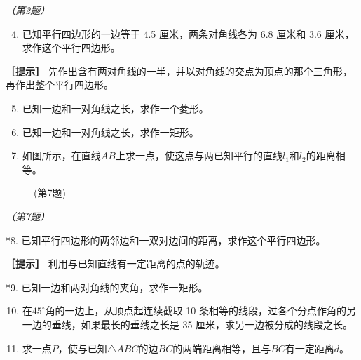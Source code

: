 \emph{（第2题）}

\begin{enumerate}
\setcounter{enumi}{3}
\item
  已知平行四边形的一边等于 4.5 厘米，两条对角线各为 6.8 厘米和 3.6
  厘米，求作这个平行四边形。
\end{enumerate}

\textbf{［提示］}
先作出含有两对角线的一半，并以对角线的交点为顶点的那个三角形，再作出整个平行四边形。

\begin{enumerate}
\setcounter{enumi}{4}
\item
  已知一边和一对角线之长，求作一个菱形。
\item
  已知一边和一对角线之长，求作一矩形。
\item
  如图所示，在直线\(AB\)上求一点，使这点与两已知平行的直线\(l_1\)和\(l_2\)的距离相等。
\end{enumerate}

\begin{figure}
\centering
{}
\caption{(第7题)}
\end{figure}

\emph{（第7题）}

*8. 已知平行四边形的两邻边和一双对边间的距离，求作这个平行四边形。

\textbf{［提示］} 利用与已知直线有一定距离的点的轨迹。

*9. 已知一边和两对角线的夹角，求作一矩形。

\begin{enumerate}
\setcounter{enumi}{9}
\item
  在\(45^{\circ}\)角的一边上，从顶点起连续截取 10
  条相等的线段，过各个分点作角的另一边的垂线，如果最长的垂线之长是 35
  厘米，求另一边被分成的线段之长。
\item
  求一点\(P\)，使与已知\(\triangle ABC\)的边\(BC\)的两端距离相等，且与\(BC\)有一定距离\(d\)。
\end{enumerate}

